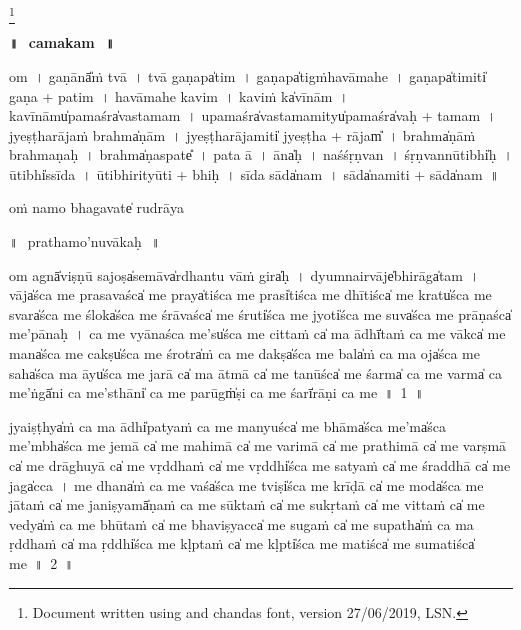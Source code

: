 \documentclass[parskip, DIV=14]{scrartcl}
\renewcommand{\thefootnote}{\fnsymbol{footnote}} %
\begin{document}
\LARGE\let\thefootnote\relax\footnote{\color{lightgray} Document written using \XeLaTeX{} and chandas font,  version 27/06/2019, LSN.}

\vspace{-1.5cm}

\begin{center}

\textbf{\Huge॥\,~camakam\,~॥}
\end{center}
\Large

{\centering	


\vspace{1cm}

om~। 
ga॒ṇānā̎ṁ tvā~।
tvā॒ ga॒ṇapa̍tim~।
ga॒ṇapa̍tigṁhavāmahe~।
ga॒ṇapa̍ti॒miti̍ ga॒ṇa + pa॒ti॒m~।
ha॒vā॒ma॒he॒ ka॒vim~।
ka॒viṁ ka̍vī॒nām~।
ka॒vī॒nāmu̍pa॒maśra̍vastamam~। 
u॒pa॒maśra̍vastama॒mityu̍pa॒maśra̍vaḥ + ta॒ma॒m~। 
jye॒ṣṭha॒rāja॒ṁ brahma̍ṇām~।
jye॒ṣṭha॒rāja॒miti̍ jyeṣṭha + rājam̎~।
brahma̍ṇāṁ brahmaṇaḥ~।
brahma̍ṇa॒spate̎~।
pa॒ta॒ ā~।
āna̍ḥ~।
na॒śśṛ॒ṇvan~।
śṛ॒ṇvannū॒tibhi̍ḥ~।
ū॒tibhi̍ssīda~।
ū॒tibhi॒rityū॒ti + bhi॒ḥ~। 
sī॒da॒ sāda̍nam~। 
sāda̍na॒miti॒ + sāda̍nam~॥ 

\vspace{5cm}

oṁ namo bhagavate̍ rudrā॒ya

\newpage
॥\,~prathamo'nuvākaḥ\,~॥\\

\vspace{1cm}

om agnā̍viṣṇū sa॒joṣa̍se॒māva̍rdhantu vā॒ṁ gira̍ḥ~। dyu॒mnairvāje̍bhi॒rāga̍tam~। vāja̍śca me prasa॒vaśca̍ me॒ praya̍tiśca me॒ prasi̍tiśca me dhī॒tiśca̍ me॒ kratu̍śca me॒ svara̍śca me॒ śloka̍śca me śrā॒vaśca̍ me॒ śruti̍śca me॒ jyoti̍śca me॒ suva̍śca me prā॒ṇaśca̍ me’pā॒naḥ~। ca॒ me vyā॒naśca॒ me’su̍śca me ci॒ttaṁ ca̍ ma॒ ādhī̍taṁ ca me॒ vākca̍ me॒ mana̍śca me॒ cakṣu̍śca me॒ śrotra̍ṁ ca me॒ dakṣa̍śca me॒ bala̍ṁ ca ma॒ oja̍śca me॒ saha̍śca ma॒ āyu̍śca me ja॒rā ca̍ ma ā॒tmā ca̍ me ta॒nūśca̍ me॒ śarma̍ ca me॒ varma̍ ca॒ me’ṅgā̍ni ca me॒’sthāni̍ ca me॒ parūgṁ̍ṣi ca me॒ śarī̍rāṇi ca me~॥~1~॥

jyaiṣṭhya̍ṁ ca ma॒ ādhi̍patyaṁ ca me ma॒nyuśca̍ me॒ bhāma̍śca॒ me’ma̍śca॒ me’mbha̍śca me je॒mā ca̍ me mahi॒mā ca̍ me vari॒mā ca̍ me prathi॒mā ca̍ me va॒rṣmā ca̍ me drāghu॒yā ca̍ me vṛ॒ddhaṁ ca̍ me॒ vṛddhi̍śca me sa॒tyaṁ ca̍ me śra॒ddhā ca̍ me॒ jaga̍cca~। me॒ dhana̍ṁ ca me॒ vaśa̍śca me॒ tviṣi̍śca me krī॒ḍā ca̍ me॒ moda̍śca me jā॒taṁ ca̍ me jani॒ṣyamā̍ṇaṁ ca me sū॒॒ktaṁ ca̍ me sukṛ॒taṁ ca̍ me vi॒ttaṁ ca̍ me॒ vedya̍ṁ ca me bhū॒॒taṁ ca̍ me bhavi॒ṣyacca̍ me su॒gaṁ ca̍ me su॒patha̍ṁ ca ma ṛ॒ddhaṁ ca̍ ma॒ ṛddhi̍śca me kḷ॒ptaṁ ca̍ me॒ kḷpti̍śca me ma॒tiśca̍ me suma॒tiśca̍ me~॥~2~॥

}
\end{document}
